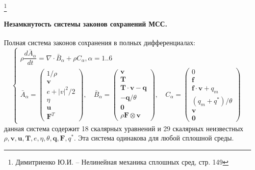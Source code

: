 \footnote{Димитриенко Ю.И. -- Нелинейная механика сплошных сред, стр. 149}

\paragraph{Незамкнутость системы законов сохранений МСС.}
Полная система законов сохранения в полных дифференциалах:
\begin{equation*}
  \begin{cases}
    \rho \dfrac{d \bar{A}_\alpha}{dt} = \nabla \cdot \bar{B}_\alpha + \rho C_\alpha, 
    \alpha = 1..6 \\

    \bar{A}_\alpha = \begin{pmatrix}
      1/\rho \\ \mathbf{v} \\ e + |v|^2 / 2 \\ \eta \\ \mathbf{u} \\ \mathbf{F}^T
    \end{pmatrix}, \quad

    \bar{B}_\alpha = \begin{pmatrix}
      \mathbf{v} \\ \mathbf{T} \\ \mathbf{T} \cdot \mathbf{v} - \mathbf{q} \\ -\mathbf{q} / \theta \\
      \mathbf{0} \\ \rho \mathbf{F} \otimes \mathbf{v}
    \end{pmatrix}, \quad

    C_\alpha = \begin{pmatrix}
      0 \\ \mathbf{f} \\ \mathbf{f} \cdot \mathbf{v} + q_m \\ 
      (q_m + q^*) / \theta \\ 
      \mathbf{v} \\ \mathbf{0}
    \end{pmatrix} 
  \end{cases}
\end{equation*}
данная система содержит 18 скалярных уравнений и 29 скалярных неизвестных
$\rho, \mathbf{v}, \mathbf{u}, \mathbf{T}, e, \eta, \theta, \mathbf{q}, \mathbf{F}, q^*$.
Эта система одинакова для любой сплошной среды.

